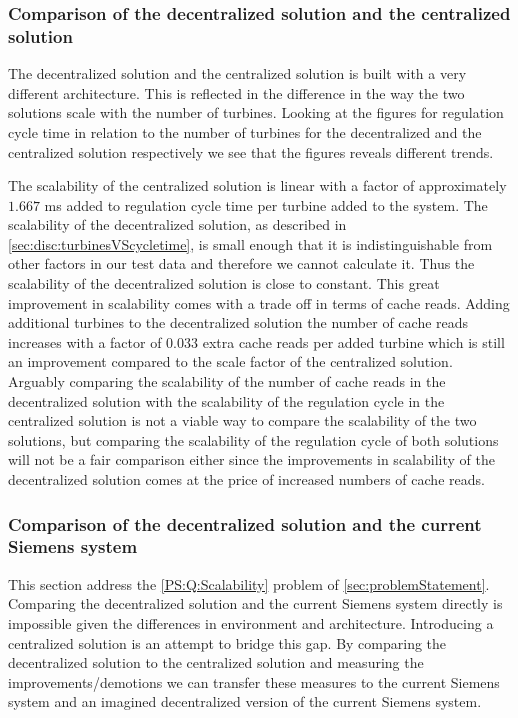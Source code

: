 \subsubsection{Comparison of the decentralized solution and the centralized solution}
\label{sec:comp:decentralizedVScentralized}
The decentralized solution and the centralized solution is built with a very different architecture. This is reflected in the difference in the way the two solutions scale with the number of turbines. Looking at the figures for regulation cycle time in relation to the number of turbines for the decentralized and the centralized solution respectively we see that the figures reveals different trends.

The scalability of the centralized solution is linear with a factor of approximately $1.667$ ms added to regulation cycle time per turbine added to the system.
The scalability of the decentralized solution, as described in \cref{sec:disc:turbinesVScycletime}, is small enough that it is indistinguishable from other factors in our test data and therefore we cannot calculate it. Thus the scalability of the decentralized solution is close to constant. This great improvement in scalability comes with a trade off in terms of cache reads. Adding additional turbines to the decentralized solution the number of cache reads increases with a factor of $0.033$ extra cache reads per added turbine which is still an improvement compared to the scale factor of the centralized solution. Arguably comparing the scalability of the number of cache reads in the decentralized solution with the scalability of the regulation cycle in the centralized solution is not a viable way to compare the scalability of the two solutions, but comparing the scalability of the regulation cycle of both solutions will not be a fair comparison either since the improvements in scalability of the decentralized solution comes at the price of increased numbers of cache reads.

\subsubsection{Comparison of the decentralized solution and the current Siemens system}
This section address the \ref{PS:Q:Scalability} problem of \cref{sec:problemStatement}.
Comparing the decentralized solution and the current Siemens system directly is impossible given the differences in environment and architecture. Introducing a centralized solution is an attempt to bridge this gap. By comparing the decentralized solution to the centralized solution and measuring the improvements/demotions we can transfer these measures to the current Siemens system and an imagined decentralized version of the current Siemens system.

